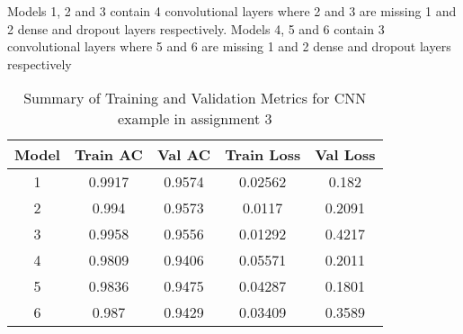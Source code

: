 Models 1, 2 and 3 contain 4 convolutional layers where 2 and 3 are missing 1 and 2 dense and dropout layers respectively.
Models 4, 5 and 6 contain 3 convolutional layers where 5 and 6 are missing 1 and 2 dense and dropout layers respectively
\begin{table}[h]
\centering
\begin{tabular}[width=0.7\textwidth]{|c|c|c|c|c|}
\hline
\textbf{Model} & \textbf{Train AC} & \textbf{Val AC} & \textbf{Train Loss} & \textbf{Val Loss} \\ \hline
1 & 0.9917 & 0.9574 & 0.02562 & 0.182 \\ \hline
2 & 0.994 & 0.9573 & 0.0117 & 0.2091 \\ \hline
3 & 0.9958 & 0.9556 & 0.01292 & 0.4217 \\ \hline
4 & 0.9809 & 0.9406 & 0.05571 & 0.2011 \\ \hline
5 & 0.9836 & 0.9475 & 0.04287 & 0.1801 \\ \hline
6 & 0.987 & 0.9429 & 0.03409 & 0.3589 \\ \hline
\end{tabular}
\label{ACtable}
\caption{Summary of Training and Validation Metrics for CNN example in assignment 3}
\end{table}